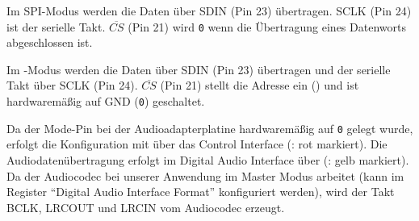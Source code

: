 
Im SPI-Modus werden die Daten über SDIN (Pin 23) übertragen. SCLK (Pin 24) ist der serielle Takt. $\overline{CS}$ (Pin 21) wird \texttt{0} wenn die Übertragung eines Datenworts abgeschlossen ist.


Im \IIC{}-Modus werden die Daten über SDIN (Pin 23) übertragen und der serielle Takt über SCLK (Pin 24). $\overline{CS}$ (Pin 21) stellt die Adresse ein () und ist hardwaremäßig auf GND (\texttt{0}) geschaltet.



Da der Mode-Pin bei der Audioadapterplatine hardwaremäßig auf \texttt{0} gelegt wurde, erfolgt die Konfiguration mit \IIC{} über das Control Interface (: rot markiert). Die Audiodatenübertragung erfolgt im Digital Audio Interface über \IIS{} (: gelb markiert). Da der Audiocodec bei unserer Anwendung im Master Modus arbeitet (kann im Register \enquote{Digital Audio Interface Format} konfiguriert werden), wird der Takt BCLK, LRCOUT und LRCIN vom Audiocodec erzeugt.


